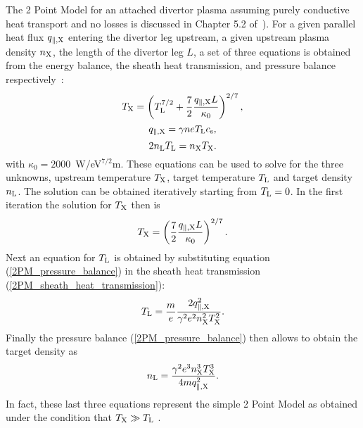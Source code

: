 \documentclass[amsmath,amssymb,a4]{revtex4-2}
\begin{document}
The 2 Point Model for an attached divertor plasma assuming purely conductive heat transport and no losses is discussed in Chapter 5.2 of~\cite{stangeby}). For a given parallel heat flux $q_{\parallel,\rm X}$ entering the divertor leg upstream, a given upstream plasma density $n_{\rm X}$, the length of the divertor leg $L$, a set of three equations is obtained from the energy balance, the sheath heat transmission, and pressure balance respectively~\cite{stangeby}:
\begin{equation}\label{2PM_energy_balance}
    T_{\rm X} = \left(T_{\rm L}^{7/2} + {7 \over 2} {q_{\parallel,\rm X} L \over \kappa_0}\right)^{2/7},
\end{equation}
\begin{equation}\label{2PM_sheath_heat_transmission}
    q_{\parallel,\rm X} = \gamma n e T_{\rm L} c_{\rm s},
\end{equation}
\begin{equation}\label{2PM_pressure_balance}
    2 n_{\rm L} T_{\rm L} = n_{\rm X} T_{\rm X}.
\end{equation}
with $\kappa_0 = 2000$~W/eV$^{7/2}$m. These equations can be used to solve for the three unknowns, upstream temperature $T_{\rm X}$, target temperature $T_{\rm L}$ and target density $n_{\rm L}$. The solution can be obtained iteratively starting from $T_{\rm L} = 0$. In the first iteration the solution for $T_{\rm X}$ then is
\begin{equation}\label{2PM_upstream_temperature}
    T_{\rm X} = \left({7 \over 2} {q_{\parallel,\rm X} L \over \kappa_0}\right)^{2/7}.
\end{equation}
Next an equation for $T_{\rm L}$ is obtained by substituting equation (\ref{2PM_pressure_balance}) in the sheath heat transmission (\ref{2PM_sheath_heat_transmission}):
\begin{equation}\label{2PM_target_temperature}
    T_{\rm L} = {m \over e} {2 q_{\parallel,\rm X}^2 \over \gamma^2 e^2 n_{\rm X}^2 T_{\rm X}^2}.
\end{equation}
Finally the pressure balance (\ref{2PM_pressure_balance}) then allows to obtain the target density as
\begin{equation}\label{2PM_target_density}
    n_{\rm L} = {\gamma^2 e^3 n_{\rm X}^3 T_{\rm X}^3 \over 4 m q_{\parallel,\rm X}^2}.
\end{equation}
In fact, these last three equations represent the simple 2 Point Model as obtained under the condition that $T_{\rm X} \gg T_{\rm L}$ \cite{stangeby}.
\end{document}
